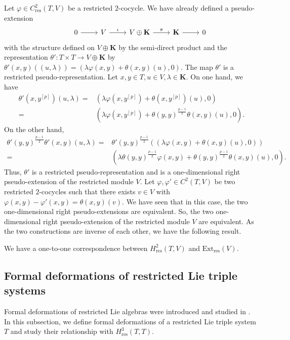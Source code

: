 \documentclass[11pt, twoside]{article}
\begin{document}
Let $\varphi\in C^2_\mathrm{res}(T,V) $ be a restricted $2$-cocycle. We have already defined a pseudo-extension  \[\begin{tikzcd}
	& 0 & V & {V\oplus \mathbf{K}} & {\mathbf{K}} & 0 
	\arrow[from=1-2, to=1-3]
	\arrow["\iota", from=1-3, to=1-4]
	\arrow["\pi", from=1-4, to=1-5]
	\arrow[from=1-5, to=1-6]
\end{tikzcd}\] with the structure defined on $V\oplus \mathbf{K}$ by the semi-direct product and the representation $\theta':T\times T\to V\oplus \mathbf{K} $ by $\theta'(x,y)((u,\lambda))= (\lambda\varphi(x,y)+ \theta(x,y)(u),0) $. The map $\theta'$ is a restricted pseudo-representation. Let $x,y\in T,u\in V,\lambda\in \mathbf{K} $. On one hand, we have  \begin{align*}
    \theta'(x,y^{[p]})(u,\lambda)=& (\lambda\varphi(x,y^{[p]})+ \theta(x,y^{[p]})(u),0)\\ =& (\lambda\varphi(x,y^{[p]})+\theta(y,y)^\frac{p-1}{2}\theta(x,y)(u),0).
\end{align*} On the other hand, \begin{align*}
    \theta'(y,y)^\frac{p-1}{2}\theta'(x,y)(u,\lambda)=& \theta'(y,y)^\frac{p-1}{2}((\lambda\varphi(x,y)+ \theta(x,y)(u),0))\\ =&( \lambda\theta(y,y)^\frac{p-1}{2}\varphi(x,y)+\theta(y,y)^\frac{p-1}{2}\theta(x,y)(u),0).
\end{align*} Thus, $\theta'$ is a restricted pseudo-representation and  is a one-dimensional right pseudo-extension of the restricted module $V$. Let $\varphi,\varphi'\in C^2(T,V) $ be two restricted $2$-cocycles such that there exists $v\in V$ with $\varphi(x,y)-\varphi'(x,y)=\theta(x,y)(v) $. We have seen that in this case, the two one-dimensional right pseudo-extensions are equivalent. So, the two one-dimensional right pseudo-extension of the restricted module $V$ are equivalent. As the two constructions are inverse of each other, we have the following result.

\begin{prop}
    We have a one-to-one correspondence between $H^2_\mathrm{res}(T,V) $ and $\mathrm{Ext}_\mathrm{res}(V) $. 
\end{prop}

\subsection{Formal deformations of restricted Lie triple systems}

Formal deformations of restricted Lie algebras were introduced and studied in \cite{EM25}. In this subsection, we define formal deformations of a restricted Lie triple system $T$ and study their relationship with $H^3_\mathrm{res}(T,T) $. 
\end{document}
